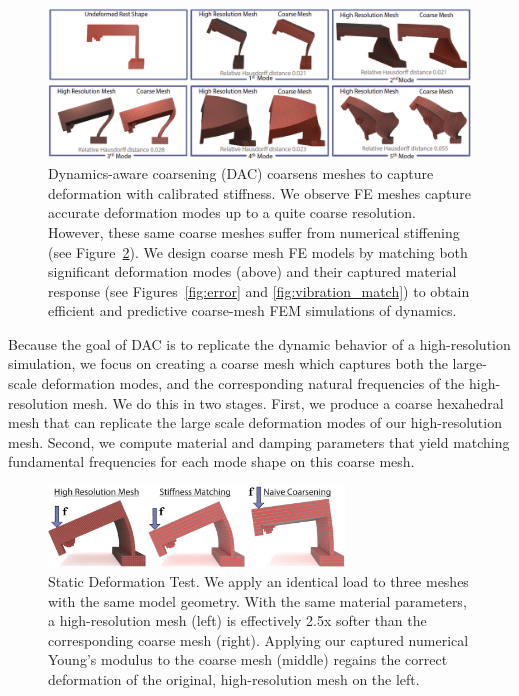 \begin{figure}
	\centering
	\includegraphics[width=0.95\columnwidth]{images/modeFit.png}
	\caption{Dynamics-aware coarsening (DAC) coarsens meshes to capture deformation with calibrated stiffness. We observe FE meshes capture accurate deformation modes up to a quite coarse resolution. However, these same coarse meshes suffer from numerical stiffening (see Figure~\ref{fig:numerical_stiffness}). We design coarse mesh FE models by matching both significant deformation modes (above) and their captured material response (see Figures~\ref{fig:error} and \ref{fig:vibration_match}) to obtain efficient and predictive coarse-mesh FEM simulations of dynamics. }
	\label{fig:defo_and_frequency_match}
\end{figure}

Because the goal of DAC is to replicate the dynamic behavior of a high-resolution simulation, we focus on creating a coarse mesh which captures both the large-scale deformation modes, and the corresponding natural frequencies of the high-resolution mesh. We do this in two stages. First, we produce a coarse hexahedral mesh that can replicate the large scale deformation modes of our high-resolution mesh. Second, we compute material and damping parameters that yield matching fundamental frequencies for each mode shape on this coarse mesh.

\begin{figure}
	\centering
	\includegraphics[width=0.7\textwidth]{figs/stiffness.pdf}
	\caption{Static Deformation Test. We apply an identical load to three meshes with the same model geometry. With the same material parameters, a high-resolution mesh (left) is effectively 2.5x softer than the corresponding coarse mesh (right). Applying our captured numerical Young's modulus to the coarse mesh (middle) regains the correct deformation of the original, high-resolution mesh on the left.}
	\label{fig:numerical_stiffness}
\end{figure}

